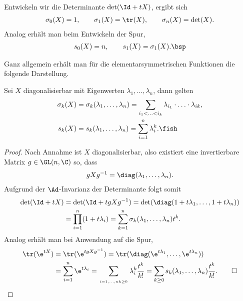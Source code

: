 \documentclass[%
	paper=a5,%
	fleqn,%
	DIV=18,%
	BCOR=0mm,
	fontsize=11pt,
	titlepage=false,%
	bibliography=totoc,
	DIV=18,%
	twoside=true,
	pdftitle=Riemannsche Geometrie,
	pdfauthor=Uwe Semmelmann,
	numbers=noendperiod]%
	{scrbook}
\begin{document}
\begin{ex}
Entwickeln wir die Determinante $\det(\Id+tX)$, ergibt sich 
\begin{align*}
\sigma_0(X) = 1,\qquad \sigma_1(X) = \tr(X),\qquad \sigma_n(X) = \det(X).
\end{align*}
Analog erhält man beim Entwickeln der Spur,
\begin{align*}
s_0(X) = n, \qquad s_1(X) = \sigma_1(X).\bsp
\end{align*}
\end{ex}

Ganz allgemein erhält man für die elementarsymmetrischen Funktionen die folgende
Darstellung.

\begin{lem}
Sei $X$ diagonalisierbar mit Eigenwerten $\lambda_1,\ldots,\lambda_n$, dann
gelten
\begin{align*}
\sigma_k(X) &= \sigma_k(\lambda_1,\ldots,\lambda_n) = \sum_{i_1 < \ldots < i_k}
\lambda_{i_1}\cdot \ldots\cdot \lambda_{ik},\\
s_k(X) &= s_k(\lambda_1,\ldots,\lambda_n) = \sum_{i=1}^n \lambda_i^k.\fish
\end{align*}
\end{lem}
\begin{proof}
Nach Annahme ist $X$ diagonalisierbar, also existiert eine invertierbare Matrix
$g\in \GL(n,\C)$ so, dass
\begin{align*}
gXg^{-1} = \diag(\lambda_1,\ldots,\lambda_n).
\end{align*}
Aufgrund der $\Ad$-Invarianz der Determinante folgt somit
\begin{align*}
\det(\Id + tX) &= \det(\Id + tgXg^{-1}) =
\det(\diag(1+t\lambda_1,\ldots,1+t\lambda_n))\\
&= \prod_{i=1}^n (1+t\lambda_i) = 
\sum_{k=1}^n \sigma_k(\lambda_1,\ldots,\lambda_n)t^k.
\end{align*}
Analog erhält man bei Anwendung auf die Spur,
\begin{align*}
\tr(\e^{tX})&= \tr(\e^{tgXg^{-1}}) = 
\tr(\diag(\e^{t\lambda_1},\ldots,\e^{t\lambda_n}))\\
&= \sum_{i=1}^n \e^{t\lambda_i} = 
\sum_{\atop{i=1,\ldots,n}{k\ge 0}} \lambda_i^k \frac{t^k}{k!}
= \sum_{k\ge 0} s_k(\lambda_1,\ldots,\lambda_n)\frac{t^k}{k!}.\qed
\end{align*}
\end{proof}
\end{document}
